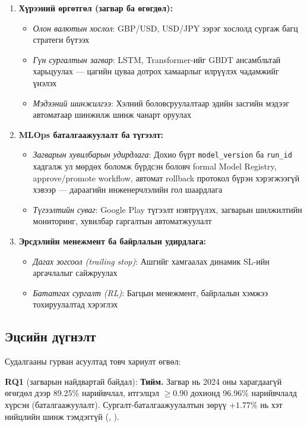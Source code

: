 \begin{enumerate}
    \item \textbf{Хүрээний өргөтгөл (загвар ба өгөгдөл):}
    \begin{itemize}
        \item \textit{Олон валютын хослол}: GBP/USD, USD/JPY зэрэг хослолд сургаж багц стратеги бүтээх
        \item \textit{Гүн сургалтын загвар}: LSTM, Transformer-ийг GBDT ансамбльтай харьцуулах --- цагийн цуваа дотрох хамаарлыг илрүүлэх чадамжийг үнэлэх
        \item \textit{Мэдээний шинжилгээ}: Хэлний боловсруулалтаар эдийн засгийн мэдээг автоматаар шинжилж шинж чанарт оруулах
    \end{itemize}

    \item \textbf{MLOps баталгаажуулалт ба түгээлт:}
    \begin{itemize}
        \item \textit{Загварын хувилбарын удирдлага}: Дохио бүрт \texttt{model\_version} ба \texttt{run\_id} хадгалж ул мөрдөх боломж бүрдсэн боловч formal Model Registry, approve/promote workflow, автомат rollback протокол бүрэн хэрэгжээгүй хэвээр --- дараагийн инженерчлэлийн гол шаардлага
        \item \textit{Түгээлтийн суваг}: Google Play түгээлт нэвтрүүлэх, загварын шилжилтийн мониторинг, хувилбар гаргалтын автоматжуулалт
    \end{itemize}

    \item \textbf{Эрсдэлийн менежмент ба байрлалын удирдлага:}
    \begin{itemize}
        \item \textit{Дагах зогсоол (trailing stop)}: Ашгийг хамгаалах динамик SL-ийн аргачлалыг сайжруулах
        \item \textit{Бататгах сургалт (RL)}: Багцын менежмент, байрлалын хэмжээ тохируулалтад хэрэглэх
    \end{itemize}
\end{enumerate}

\subsection{Эцсийн дүгнэлт}

Судалгааны гурван асуултад товч хариулт өгвөл:

\textbf{RQ1} (загварын найдвартай байдал): \textbf{Тийм.} Загвар нь 2024 оны харагдаагүй өгөгдөл дээр 89.25\% нарийвчлал, итгэлцэл $\geq$0.90 дохионд 96.96\% нарийвчлалд хүрсэн (баталгаажуулалт). Сургалт-баталгаажуулалтын зөрүү $+1.77\%$ нь хэт нийцлийн шинж тэмдэггүй (, ).


